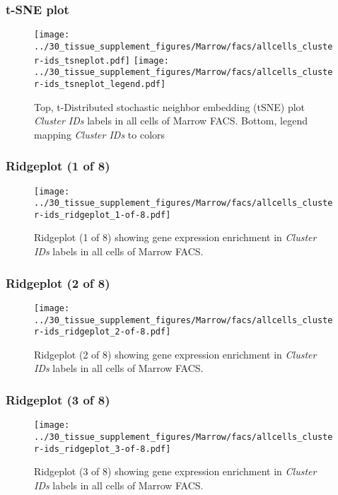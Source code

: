 \clearpage
\subsubsection{t-SNE plot}
\begin{figure}[h]
\centering
\texttt{[image: ../30\_tissue\_supplement\_figures/Marrow/facs/allcells\_cluster-ids\_tsneplot.pdf]}
\texttt{[image: ../30\_tissue\_supplement\_figures/Marrow/facs/allcells\_cluster-ids\_tsneplot\_legend.pdf]}
\caption{Top, t-Distributed stochastic neighbor embedding (tSNE) plot  \emph{Cluster IDs} labels in all cells of Marrow FACS. Bottom, legend mapping \emph{Cluster IDs} to colors}
\end{figure}


\clearpage

\subsubsection{Ridgeplot (1 of 8)}
\begin{figure}[h]
\centering
\texttt{[image: ../30\_tissue\_supplement\_figures/Marrow/facs/allcells\_cluster-ids\_ridgeplot\_1-of-8.pdf]}

\caption{ Ridgeplot (1 of 8)  showing gene expression enrichment in \emph{Cluster IDs} labels in all cells of Marrow FACS. }
\end{figure}


\clearpage

\subsubsection{Ridgeplot (2 of 8)}
\begin{figure}[h]
\centering
\texttt{[image: ../30\_tissue\_supplement\_figures/Marrow/facs/allcells\_cluster-ids\_ridgeplot\_2-of-8.pdf]}

\caption{ Ridgeplot (2 of 8)  showing gene expression enrichment in \emph{Cluster IDs} labels in all cells of Marrow FACS. }
\end{figure}


\clearpage

\subsubsection{Ridgeplot (3 of 8)}
\begin{figure}[h]
\centering
\texttt{[image: ../30\_tissue\_supplement\_figures/Marrow/facs/allcells\_cluster-ids\_ridgeplot\_3-of-8.pdf]}

\caption{ Ridgeplot (3 of 8)  showing gene expression enrichment in \emph{Cluster IDs} labels in all cells of Marrow FACS. }
\end{figure}


